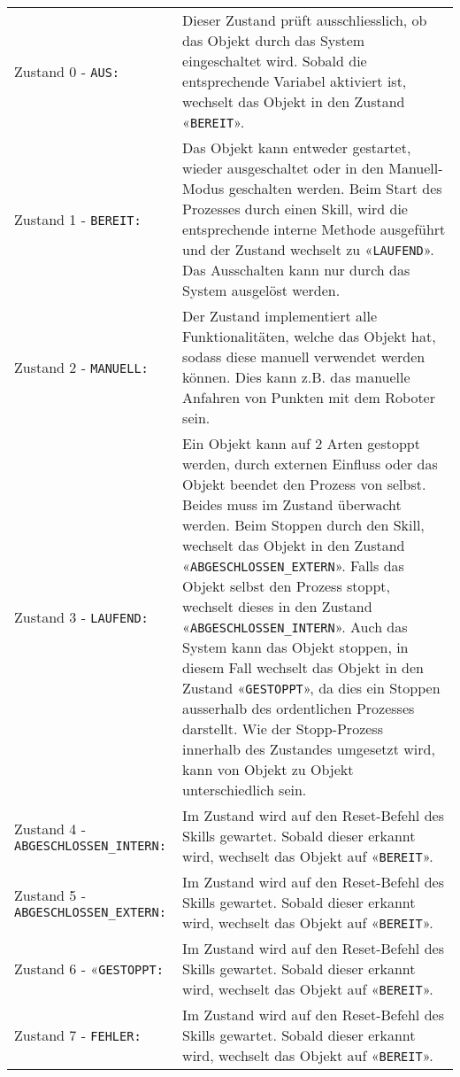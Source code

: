 		\begin{tabularx}{\textwidth}{@{}>{}p{16em} X@{}}
			Zustand 0 - \verb|AUS:| & 
			Dieser Zustand prüft ausschliesslich, ob das Objekt durch das System eingeschaltet wird. Sobald die entsprechende Variabel aktiviert ist, wechselt das Objekt in den Zustand «\verb|BEREIT|». 
			\\
			Zustand 1 - \verb|BEREIT:| & 
			Das Objekt kann entweder gestartet, wieder ausgeschaltet oder in den Manuell-Modus geschalten werden. Beim Start des Prozesses durch einen Skill, wird die entsprechende interne Methode ausgeführt und der Zustand wechselt zu «\verb|LAUFEND|». Das Ausschalten kann nur durch das System ausgelöst werden.
			\\
			Zustand 2 - \verb|MANUELL:| & 
			Der Zustand implementiert alle Funktionalitäten, welche das Objekt hat, sodass diese manuell verwendet werden können. Dies kann z.B. das manuelle Anfahren von Punkten mit dem Roboter sein.  
			\\
			Zustand 3 - \verb|LAUFEND:| & 
			Ein Objekt kann auf 2 Arten gestoppt werden, durch externen Einfluss oder das Objekt beendet den Prozess von selbst. Beides muss im Zustand überwacht werden. Beim Stoppen durch den Skill, wechselt das Objekt in den Zustand «\verb|ABGESCHLOSSEN_EXTERN|». Falls das Objekt selbst den Prozess stoppt, wechselt dieses in den Zustand «\verb|ABGESCHLOSSEN_INTERN|». Auch das System kann das Objekt stoppen, in diesem Fall wechselt das Objekt in den Zustand «\verb|GESTOPPT|», da dies ein Stoppen ausserhalb des ordentlichen Prozesses darstellt. Wie der Stopp-Prozess innerhalb des Zustandes umgesetzt wird, kann von Objekt zu Objekt unterschiedlich sein.
			\\
			Zustand 4 - \verb|ABGESCHLOSSEN_INTERN:| & 
			Im Zustand wird auf den Reset-Befehl des Skills gewartet. Sobald dieser erkannt wird, wechselt das Objekt auf «\verb|BEREIT|». 
			\\
			Zustand 5 - \verb|ABGESCHLOSSEN_EXTERN:| & 
			Im Zustand wird auf den Reset-Befehl des Skills gewartet. Sobald dieser erkannt wird, wechselt das Objekt auf «\verb|BEREIT|».
			\\
			Zustand 6 - «\verb|GESTOPPT:| & 
			Im Zustand wird auf den Reset-Befehl des Skills gewartet. Sobald dieser erkannt wird, wechselt das Objekt auf «\verb|BEREIT|».
			\\
			Zustand 7 - \verb|FEHLER:| & 
			Im Zustand wird auf den Reset-Befehl des Skills gewartet. Sobald dieser erkannt wird, wechselt das Objekt auf «\verb|BEREIT|».
			\\
		\end{tabularx}
		
